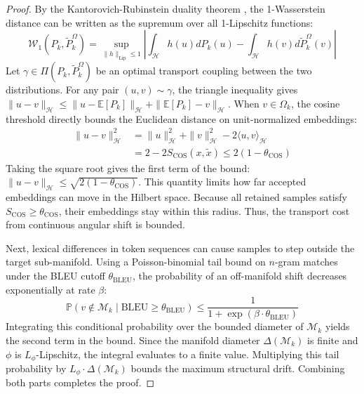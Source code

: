 \documentclass[10pt,journal,compsoc]{IEEEtran}
\begin{document}
\begin{proof}
By the Kantorovich-Rubinstein duality theorem \cite{villani2009optimal, peyre2019computational}, the 1-Wasserstein distance can be written as the supremum over all 1-Lipschitz functions:
\begin{equation}
    \mathcal{W}_1(P_k, \tilde{P}_k^{\Omega}) = \sup_{\|h\|_{\text{Lip}} \le 1} \left| \int_{\mathcal{H}} h(u) dP_k(u) - \int_{\mathcal{H}} h(v) d\tilde{P}_k^{\Omega}(v) \right|
\end{equation}
Let $\gamma \in \Pi(P_k, \tilde{P}_k^{\Omega})$ be an optimal transport coupling between the two distributions. For any pair $(u, v) \sim \gamma$, the triangle inequality gives $\|u - v\|_\mathcal{H} \le \|u - \mathbb{E}[P_k]\|_\mathcal{H} + \|\mathbb{E}[P_k] - v\|_\mathcal{H}$. When $v \in \Omega_k$, the cosine threshold directly bounds the Euclidean distance on unit-normalized embeddings:
\begin{align}
    \|u - v\|_\mathcal{H}^2 &= \|u\|_\mathcal{H}^2 + \|v\|_\mathcal{H}^2 - 2 \langle u, v \rangle_\mathcal{H} \nonumber \\
    &= 2 - 2 S_{\text{COS}}(x, \tilde{x}) \le 2(1 - \theta_{\text{COS}})
\end{align}
Taking the square root gives the first term of the bound: $\|u - v\|_\mathcal{H} \le \sqrt{2(1 - \theta_{\text{COS}})}$. This quantity limits how far accepted embeddings can move in the Hilbert space. Because all retained samples satisfy $S_{\text{COS}} \ge \theta_{\text{COS}}$, their embeddings stay within this radius. Thus, the transport cost from continuous angular shift is bounded.

Next, lexical differences in token sequences can cause samples to step outside the target sub-manifold. Using a Poisson-binomial tail bound on $n$-gram matches under the BLEU cutoff $\theta_{\text{BLEU}}$, the probability of an off-manifold shift decreases exponentially at rate $\beta$:
\begin{equation}
    \mathbb{P}\left(v \notin \mathcal{M}_k \mid \text{BLEU} \ge \theta_{\text{BLEU}}\right) \le \frac{1}{1 + \exp(\beta \cdot \theta_{\text{BLEU}})}
\end{equation}
Integrating this conditional probability over the bounded diameter of $\mathcal{M}_k$ yields the second term in the bound. Since the manifold diameter $\Delta(\mathcal{M}_k)$ is finite and $\phi$ is $L_\phi$-Lipschitz, the integral evaluates to a finite value. Multiplying this tail probability by $L_\phi \cdot \Delta(\mathcal{M}_k)$ bounds the maximum structural drift. Combining both parts completes the proof.
\end{proof}
\end{document}
